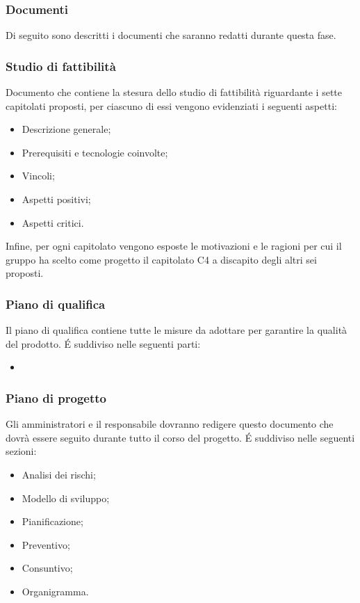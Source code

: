\subsubsection{Documenti}
Di seguito sono descritti i documenti che saranno redatti durante questa fase.
\subsubsection{Studio di fattibilità}
Documento che contiene la stesura dello studio di fattibilità riguardante i sette capitolati proposti, per ciascuno di essi vengono evidenziati i seguenti aspetti:
\begin{itemize}
    \item Descrizione generale;
    \item Prerequisiti e tecnologie coinvolte;
    \item Vincoli;
    \item Aspetti positivi;
    \item Aspetti critici.
\end{itemize}
Infine, per ogni capitolato vengono esposte le motivazioni e le ragioni per cui il gruppo ha scelto come progetto il capitolato C4 \NomeProgetto{} a discapito degli altri sei proposti.\\

\subsubsection{Piano di qualifica}
Il piano di qualifica contiene tutte le misure da adottare per garantire la qualità del prodotto. \'E suddiviso nelle seguenti parti:
\begin{itemize}
\item
\end{itemize} 
\subsubsection{Piano di progetto}
Gli amministratori e il responsabile dovranno redigere questo documento che dovrà essere seguito durante tutto il corso del progetto. \'E suddiviso nelle seguenti sezioni:
\begin{itemize}
    \item Analisi dei rischi;
    \item Modello di sviluppo;
   \item Pianificazione;  
    \item Preventivo;
    \item Consuntivo;
    \item Organigramma.   
\end{itemize}
